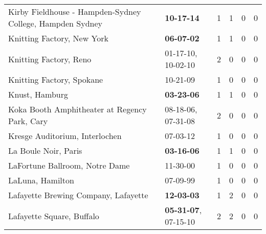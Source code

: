 \begin{longtable}{p{}p{}p{}p{}p{}p{}}
                    Kirby Fieldhouse - Hampden-Sydney College, Hampden Sydney &                                       \textbf{10-17-14\textsuperscript{}} &  1 &  1 &  0 &  0 \\
                                                   Knitting Factory, New York &                                       \textbf{06-07-02\textsuperscript{}} &  1 &  1 &  0 &  0 \\
                                                       Knitting Factory, Reno &                    01-17-10\textsuperscript{}, 10-02-10\textsuperscript{} &  2 &  0 &  0 &  0 \\
                                                    Knitting Factory, Spokane &                                                10-21-09\textsuperscript{} &  1 &  0 &  0 &  0 \\
                                                               Knust, Hamburg &                                       \textbf{03-23-06\textsuperscript{}} &  1 &  1 &  0 &  0 \\
                                Koka Booth Amphitheater at Regency Park, Cary &                    08-18-06\textsuperscript{}, 07-31-08\textsuperscript{} &  2 &  0 &  0 &  0 \\
                                               Kresge Auditorium, Interlochen &                                                07-03-12\textsuperscript{} &  1 &  0 &  0 &  0 \\
                                                         La Boule Noir, Paris &                                       \textbf{03-16-06\textsuperscript{}} &  1 &  1 &  0 &  0 \\
                                               LaFortune Ballroom, Notre Dame &                                                11-30-00\textsuperscript{} &  1 &  0 &  0 &  0 \\
                                                             LaLuna, Hamilton &                                                07-09-99\textsuperscript{} &  1 &  0 &  0 &  0 \\
                                         Lafayette Brewing Company, Lafayette &                                       \textbf{12-03-03\textsuperscript{}} &  1 &  2 &  0 &  0 \\
                                                    Lafayette Square, Buffalo &           \textbf{05-31-07\textsuperscript{}}, 07-15-10\textsuperscript{} &  2 &  2 &  0 &  0 \\

\end{longtable}
